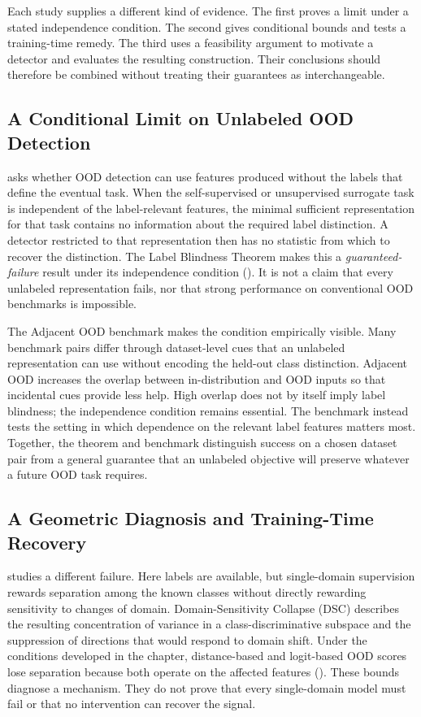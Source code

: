 Each study supplies a different kind of evidence. The first proves a limit under a
stated independence condition. The second gives conditional bounds and tests a
training-time remedy. The third uses a feasibility argument to motivate a detector
and evaluates the resulting construction. Their conclusions should therefore be
combined without treating their guarantees as interchangeable.

\subsection{A Conditional Limit on Unlabeled OOD Detection}

 asks whether OOD detection can use features produced
without the labels that define the eventual task. When the self-supervised or
unsupervised surrogate task is independent of the label-relevant features, the
minimal sufficient representation for that task contains no
information about the required label distinction. A detector restricted to that
representation then has no statistic from which to recover the distinction. The
Label Blindness Theorem makes this a \emph{guaranteed-failure} result under its
independence condition (). It is not a claim that every
unlabeled representation fails, nor that strong performance on conventional OOD
benchmarks is impossible.

The Adjacent OOD benchmark makes the condition empirically visible. Many benchmark
pairs differ through dataset-level cues that an unlabeled representation can use
without encoding the held-out class distinction. Adjacent OOD increases the overlap
between in-distribution and OOD inputs so that incidental cues provide less help.
High overlap does not by itself imply label blindness; the independence condition
remains essential. The benchmark instead tests the setting in which dependence on
the relevant label features matters most. Together, the theorem and benchmark
distinguish success on a chosen dataset pair from a general guarantee that an
unlabeled objective will preserve whatever a future OOD task requires.

\subsection{A Geometric Diagnosis and Training-Time Recovery}

 studies a different failure. Here labels are
available, but single-domain supervision rewards separation among the known classes
without directly rewarding sensitivity to changes of domain. Domain-Sensitivity
Collapse (DSC) describes the resulting concentration of variance in a
class-discriminative subspace and the suppression of directions that would respond
to domain shift. Under the conditions developed in the chapter, distance-based and
logit-based OOD scores lose separation because both operate on the affected
features (). These bounds diagnose a
mechanism. They do not prove that every single-domain model must fail or that no
intervention can recover the signal.

